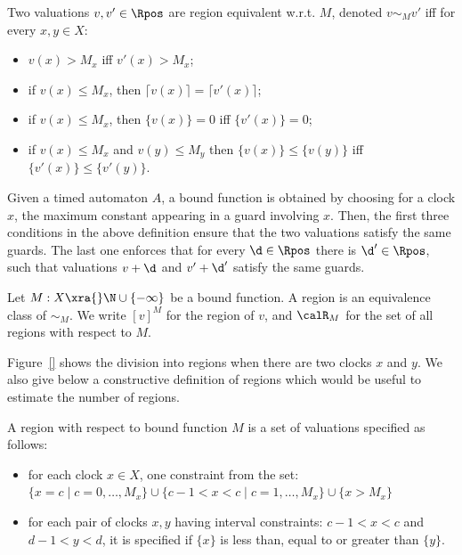 \begin{definition}
Two valuations $v, v' \in \Rpos$ are region equivalent w.r.t. $M$, denoted $v \sim_M v'$ iﬀ for every $x, y \in X$:
\begin{itemize}
	\item $v(x) > M_x$ iﬀ $v'(x) > M_x$;
	\item if $v(x) \leq M_x$, then $\lceil v(x) \rceil = \lceil v'(x) \rceil$;
	\item if $v(x) \leq M_x$, then $\{v(x)\} = 0$ iﬀ $\{v'(x)\} = 0$;
	\item if $v(x) \leq M_x$ and $v(y) \leq M_y$ then $\{v(x)\} \leq \{v(y)\}$ iﬀ $\{v'(x)\} \leq \{v'(y)\}$.
\end{itemize}
\end{definition}

Given a timed automaton $A$, a bound function is obtained by choosing for a clock $x$, the maximum constant appearing in a guard involving $x$. Then, the first three conditions in the above definition ensure that the two valuations satisfy the same guards. The last one enforces that for every $\d \in \Rpos$ there is $\d' \in \Rpos$, such that valuations $v + \d$ and $v' + \d'$ satisfy the same guards.

\begin{definition}
Let $M : X \xra{} \N \cup \{-\infty\}$ be a bound function. A region is an equivalence class of $\sim_M$. We write $[v]^M$ for the region of $v$, and $\calR_M$ for the set of all regions with respect to $M$.
\end{definition}

Figure~\ref{} shows the division into regions when there are two clocks $x$ and $y$. We also give below a constructive definition of regions which would be useful to estimate the number of regions.

\begin{definition}
A region with respect to bound function $M$ is a set of valuations specified as follows:
\begin{itemize}
	\item for each clock $x \in X$, one constraint from the set: $\{x = c \mid c = 0, \dots, M_x\} \cup \{c - 1 < x < c \mid c = 1, \dots, M_x\} \cup \{x > M_x\}$
	\item for each pair of clocks $x, y$ having interval constraints: $c - 1 < x < c$ and $d - 1 < y < d$, it is specified if $\{x\}$ is less than, equal to or greater than $\{y\}$.
\end{itemize}
\end{definition}

